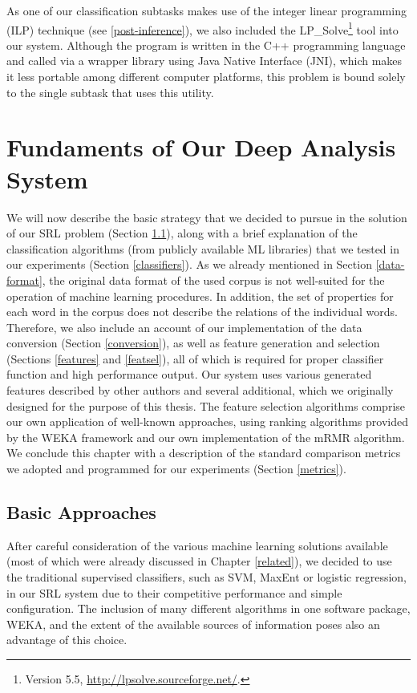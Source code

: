 \documentclass[12pt,notitlepage,a4paper]{report}
\begin{document}
As one of our classification subtasks makes use of the integer linear programming (ILP) technique (see \ref{post-inference}), we also included the LP\_Solve\footnote{Version 5.5, \url{http://lpsolve.sourceforge.net/}.} tool into our system. Although the program is written in the C++ programming language and called via a wrapper library using Java Native Interface (JNI), which makes it less portable among different computer platforms, this problem is bound solely to the single subtask that uses this utility.

%
%
\chapter{Fundaments of Our Deep Analysis System}\label{ml-semantic}
%
%

We will now describe the basic strategy that we decided to pursue in the solution of our SRL problem (Section \ref{approach}), along with a brief explanation of the classification algorithms (from publicly available ML libraries) that we tested in our experiments (Section \ref{classifiers}). As we already mentioned in Section \ref{data-format}, the original data format of the used corpus is not well-suited for the operation of machine learning procedures. In addition, the set of properties for each word in the corpus does not describe the relations of the individual words. Therefore, we also include an account of our implementation of the data conversion (Section \ref{conversion}), as well as feature generation and selection (Sections \ref{features} and \ref{featsel}), all of which is required for proper classifier function and high performance output. Our system uses various generated features described by other authors and several additional, which we originally designed for the purpose of this thesis. The feature selection algorithms comprise our own application of well-known approaches, using ranking algorithms provided by the WEKA framework and our own implementation of the mRMR algorithm. We conclude this chapter with a description of the standard comparison metrics we adopted and programmed for our experiments (Section \ref{metrics}).

\section{Basic Approaches}\label{approach}

After careful consideration of the various machine learning solutions available (most of which were already discussed in Chapter \ref{related}), we decided to use the traditional supervised classifiers, such as SVM, MaxEnt or logistic regression, in our SRL system due to their competitive performance and simple configuration. The inclusion of many different algorithms in one software package, WEKA, and the extent of the available sources of information poses also an advantage of this choice.
\end{document}
